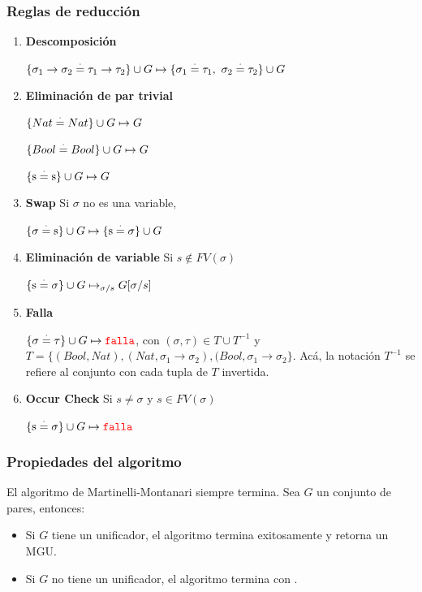 \subsubsection{Reglas de reducción}

\begin{enumerate}
\item \textbf{Descomposición}

$\{\sigma_1\to\sigma_2 \overset{\cdot}{=}\tau_1\to\tau_2\}\cup G\mapsto \{\sigma_1\overset{\cdot}{=}\tau_1,~\sigma_2 \overset{\cdot}{=}\tau_2\}\cup G$
\item \textbf{Eliminación de par trivial}

$\{Nat \overset{\cdot}{=} Nat\}\cup G\mapsto G$

$\{ Bool \overset{\cdot}{=} Bool\}\cup G\mapsto G$

$\{\text{s} \overset{\cdot}{=}\text{s}\}\cup G\mapsto G$
\item \textbf{Swap} Si $\sigma$ no es una variable,

$\{\sigma \overset{\cdot}{=}\text{s}\}\cup G\mapsto \{\text{s}\overset{\cdot}{=}\sigma\}\cup G$

\item \textbf{Eliminación de variable} Si $s\notin FV(\sigma)$

$\{\text{s}\overset{\cdot}{=}\sigma\}\cup G\mapsto_{\sigma/s} G[\sigma/s]$

\item \textbf{Falla}

$\{\sigma\overset{\cdot}{=}\tau\}\cup G\mapsto {\color{red}\texttt{falla}}$, con $(\sigma,\tau)\in T\cup T^{-1}$ y $T =\{( Bool,Nat), (Nat, \sigma_1\to\sigma_2), ( Bool, \sigma_1\to\sigma_2\}$. Acá, la notación $T^{-1}$ se refiere al conjunto con cada tupla de $T$ invertida.

\item \textbf{Occur Check} Si $s\neq\sigma$ y $s\in FV(\sigma)$

$\{\text{s}\overset{\cdot}{=}\sigma\}\cup G\mapsto {\color{red}\texttt{falla}}$
\end{enumerate}

\subsubsection{Propiedades del algoritmo}
El algoritmo de Martinelli-Montanari siempre termina. Sea $G$ un conjunto de pares, entonces:
\begin{itemize}
\item Si $G$ tiene un unificador, el algoritmo termina exitosamente y retorna un MGU.
\item Si $G$ no tiene un unificador, el algoritmo termina con .
\end{itemize}

